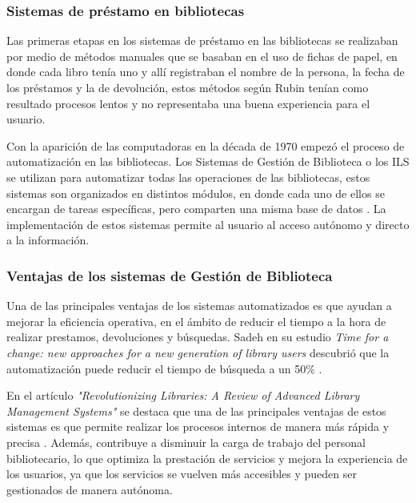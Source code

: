 \documentclass[spanish]{ieee_upb}
\begin{document}
\subsubsection{Sistemas de préstamo en bibliotecas}
Las primeras etapas en los sistemas de préstamo en las bibliotecas se realizaban por medio de métodos manuales que se basaban en el uso de fichas de papel, en donde cada libro tenía uno y allí registraban el nombre de la persona, la fecha de los préstamos y la de devolución, estos métodos según Rubin tenían como resultado procesos lentos y no representaba una buena experiencia para el usuario.\cite{rubin2020foundations}
\vspace{0.3 cm}
   
Con la aparición de las computadoras en la década de 1970 empezó el proceso de automatización en las bibliotecas.  Los Sistemas de Gestión de Biblioteca o los ILS se utilizan para automatizar todas las operaciones de las bibliotecas, estos sistemas son organizados en distintos módulos, en donde cada uno de ellos se encargan de tareas específicas, pero comparten una misma base de datos \cite{picco2011manual}. La implementación de estos sistemas permite al usuario al acceso autónomo y directo a la información. 

\subsubsection{Ventajas de los sistemas de Gestión de Biblioteca}

Una de las principales ventajas de los sistemas automatizados es que ayudan a mejorar la eficiencia operativa, en el ámbito de reducir el tiempo a la hora de realizar prestamos, devoluciones y búsquedas. Sadeh en su estudio \textit{Time for a change: new approaches for a new generation of library users} descubrió que la automatización puede reducir el tiempo de búsqueda a un 50\% \cite{sadeh2007time}.
\vspace{0.3 cm}

En el artículo \textit{"Revolutionizing Libraries: A Review of Advanced Library Management Systems"} se destaca que una de las principales ventajas de estos sistemas es que permite realizar los procesos internos de manera más rápida y precisa \cite{Singh2024}. Además, contribuye a disminuir la carga de trabajo del personal bibliotecario, lo que optimiza la prestación de servicios y mejora la experiencia de los usuarios, ya que los servicios se vuelven más accesibles y pueden ser gestionados de manera autónoma. 
\end{document}
